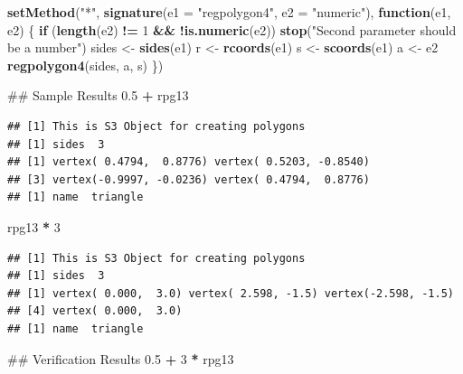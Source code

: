 \documentclass[]{article}
\newenvironment{Shaded}{\begin{snugshade}}{\end{snugshade}}
\newcommand{\KeywordTok}[1]{\textcolor[rgb]{0.13,0.29,0.53}{\textbf{#1}}}
\newcommand{\DataTypeTok}[1]{\textcolor[rgb]{0.13,0.29,0.53}{#1}}
\newcommand{\DecValTok}[1]{\textcolor[rgb]{0.00,0.00,0.81}{#1}}
\newcommand{\FloatTok}[1]{\textcolor[rgb]{0.00,0.00,0.81}{#1}}
\newcommand{\StringTok}[1]{\textcolor[rgb]{0.31,0.60,0.02}{#1}}
\newcommand{\ControlFlowTok}[1]{\textcolor[rgb]{0.13,0.29,0.53}{\textbf{#1}}}
\newcommand{\OperatorTok}[1]{\textcolor[rgb]{0.81,0.36,0.00}{\textbf{#1}}}
\newcommand{\NormalTok}[1]{#1}
\begin{document}
\begin{Shaded}
\begin{Highlighting}[]
\KeywordTok{setMethod}\NormalTok{(}\StringTok{"*"}\NormalTok{, }\KeywordTok{signature}\NormalTok{(}\DataTypeTok{e1 =} \StringTok{"regpolygon4"}\NormalTok{, }\DataTypeTok{e2 =} \StringTok{"numeric"}\NormalTok{), }\ControlFlowTok{function}\NormalTok{(e1, e2) \{ }
  \ControlFlowTok{if}\NormalTok{ (}\KeywordTok{length}\NormalTok{(e2) }\OperatorTok{!=}\StringTok{ }\DecValTok{1} \OperatorTok{&&}\StringTok{ }\OperatorTok{!}\KeywordTok{is.numeric}\NormalTok{(e2)) }
      \KeywordTok{stop}\NormalTok{(}\StringTok{"Second parameter should be a number"}\NormalTok{) }
\NormalTok{    sides <-}\StringTok{ }\KeywordTok{sides}\NormalTok{(e1)}
\NormalTok{    r <-}\StringTok{ }\KeywordTok{rcoords}\NormalTok{(e1)}
\NormalTok{    s <-}\StringTok{ }\KeywordTok{scoords}\NormalTok{(e1)}
\NormalTok{    a <-}\StringTok{ }\NormalTok{e2 }
  \KeywordTok{regpolygon4}\NormalTok{(sides, a, s) }
\NormalTok{\})}


\NormalTok{## Sample Results}
\FloatTok{0.5} \OperatorTok{+}\StringTok{ }\NormalTok{rpg13}
\end{Highlighting}
\end{Shaded}

\begin{verbatim}
## [1] This is S3 Object for creating polygons
## [1] sides  3
## [1] vertex( 0.4794,  0.8776) vertex( 0.5203, -0.8540)
## [3] vertex(-0.9997, -0.0236) vertex( 0.4794,  0.8776)
## [1] name  triangle
\end{verbatim}

\begin{Shaded}
\begin{Highlighting}[]
\NormalTok{rpg13 }\OperatorTok{*}\StringTok{ }\DecValTok{3}
\end{Highlighting}
\end{Shaded}

\begin{verbatim}
## [1] This is S3 Object for creating polygons
## [1] sides  3
## [1] vertex( 0.000,  3.0) vertex( 2.598, -1.5) vertex(-2.598, -1.5)
## [4] vertex( 0.000,  3.0)
## [1] name  triangle
\end{verbatim}

\begin{Shaded}
\begin{Highlighting}[]
\NormalTok{## Verification Results}
\FloatTok{0.5} \OperatorTok{+}\StringTok{ }\DecValTok{3} \OperatorTok{*}\StringTok{ }\NormalTok{rpg13}
\end{Highlighting}
\end{Shaded}
\end{document}
